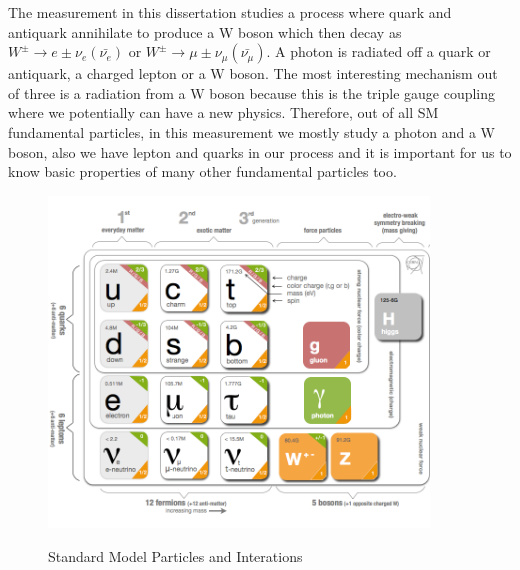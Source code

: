 The measurement in this dissertation studies a process where quark and antiquark annihilate to produce a W boson which then decay as $W^\pm \rightarrow e\pm \nu_e(\bar{\nu_e})$ or $W^\pm \rightarrow \mu\pm \nu_\mu(\bar{\nu_\mu}) $. A photon is radiated off a quark or antiquark, a charged lepton or a W boson. The most interesting mechanism out of three is a radiation from a W boson because this is the triple gauge coupling where we potentially can have a new physics. Therefore, out of all SM fundamental particles, in this measurement we mostly study a photon and a W boson, also we have lepton and quarks in our process and it is important for us to know basic properties of many other fundamental particles too.\\


\begin{figure}[htb]
  \begin{center}
    {\includegraphics[width=0.90\textwidth]{../figs/Intro/StandardModel.png}}
    \caption{Standard Model Particles and Interations}
    \label{fig:SMtable}
  \end{center}
\end{figure}





